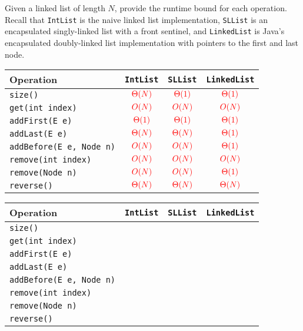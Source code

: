 \question Given a linked list of length $N$, provide the runtime bound for each operation. Recall that \texttt{IntList} is the naive linked list implementation, \texttt{SLList} is an encapsulated singly-linked list with a front sentinel, and \texttt{LinkedList} is Java's encapsulated doubly-linked list implementation with pointers to the first and last node.

\ifprintanswers
{
\renewcommand{\arraystretch}{2}
\setlength{\tabcolsep}{16pt}
\begin{tabularx}{\textwidth}{Xccc}
Operation                       & \texttt{IntList}       & \texttt{SLList}        & \texttt{LinkedList}    \\\hline
\texttt{size()}                 & $\color{red}\Theta(N)$ & $\color{red}\Theta(1)$ & $\color{red}\Theta(1)$ \\
\texttt{get(int index)}         & $\color{red}O(N)$      & $\color{red}O(N)$      & $\color{red}O(N)$      \\
\texttt{addFirst(E e)}          & $\color{red}\Theta(1)$ & $\color{red}\Theta(1)$ & $\color{red}\Theta(1)$ \\
\texttt{addLast(E e)}           & $\color{red}\Theta(N)$ & $\color{red}\Theta(N)$ & $\color{red}\Theta(1)$ \\
\texttt{addBefore(E e, Node n)} & $\color{red}O(N)$      & $\color{red}O(N)$      & $\color{red}\Theta(1)$ \\
\texttt{remove(int index)}      & $\color{red}O(N)$      & $\color{red}O(N)$      & $\color{red}O(N)$      \\
\texttt{remove(Node n)}         & $\color{red}O(N)$      & $\color{red}O(N)$      & $\color{red}\Theta(1)$ \\
\texttt{reverse()}              & $\color{red}\Theta(N)$ & $\color{red}\Theta(N)$ & $\color{red}\Theta(N)$ \\
\end{tabularx}
}
\else
{
\renewcommand{\arraystretch}{2}
\setlength{\tabcolsep}{16pt}
\begin{tabularx}{\textwidth}{Xccc}
Operation                       & \texttt{IntList} & \texttt{SLList} & \texttt{LinkedList} \\ \hline
\texttt{size()}                 &                  &                 &                     \\
\texttt{get(int index)}         &                  &                 &                     \\
\texttt{addFirst(E e)}          &                  &                 &                     \\
\texttt{addLast(E e)}           &                  &                 &                     \\
\texttt{addBefore(E e, Node n)} &                  &                 &                     \\
\texttt{remove(int index)}      &                  &                 &                     \\
\texttt{remove(Node n)}         &                  &                 &                     \\
\texttt{reverse()}              &                  &                 &                     \\
\end{tabularx}
}
